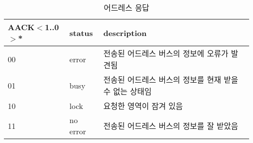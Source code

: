 %
%
\begin{table}[htbp]
\caption{어드레스 응답}
   \begin{center}
   \begin{tabular}{|l|l|l|} \hline
      AACK$<$1..0$>$* & status & description \\ \hline \hline
      00 & error & 전송된 어드레스 버스의 정보에 오류가 발견됨 \\ \hline
      01 & busy & 전송된 어드레스 버스의 정보를 현재 받을 수 없는 상태임 \\ \hline
      10 & lock & 요청한 영역이 잠겨 있음 \\ \hline
      11 & no error & 전송된 어드레스 버스의 정보를 잘 받았음 \\ \hline
   \end{tabular}
   \end{center}
\end{table}
%
%
